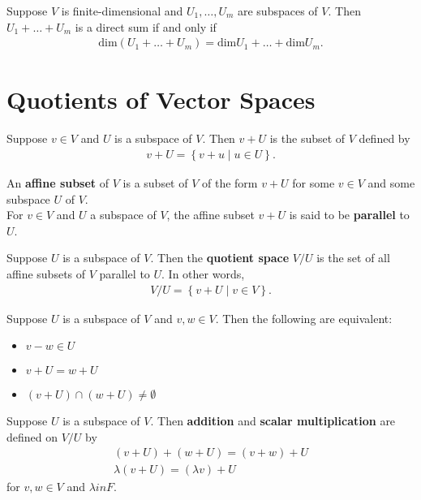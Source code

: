 \documentclass{memoir}
\begin{document}
\begin{lemma}
	Suppose $V$ is finite-dimensional and $U_1,\ldots,U_m$ are subspaces of $V$. Then $U_1+\ldots+U_m$ is a direct sum if and only if
	\begin{align*}
		\textrm{dim}(U_1+\ldots+U_m) = \textrm{dim}U_1 + \ldots + \textrm{dim}U_m.
	\end{align*}
\end{lemma}
\section{Quotients of Vector Spaces}
\label{sec:quotients_of_vector_spaces}
\begin{defn}[v + U]
	Suppose $v \in V$ and $U$ is a subspace of $V$. Then $v+U$ is the subset of $V$ defined by 
	\begin{align*}
		v + U = \left\{v+u \mid u \in U \right\} .
	\end{align*}
\end{defn}
\begin{defn}
	An \textbf{affine subset} of $V$ is a subset of $V$ of the form $v+U$ for some $v \in V$ and some subspace $U$ of $V$.\\

	For $v \in V$ and $U$ a subspace of $V$, the affine subset $v+U$ is said to be \textbf{parallel} to $U$.
\end{defn}
\begin{defn}
	Suppose $U$ is a subspace of $V$. Then the \textbf{quotient space} $V / U$ is the set of all affine subsets of $V$ parallel to $U$. In other words,
	\begin{align*}
		V / U = \left\{v + U \mid v \in V \right\}.
	\end{align*}
\end{defn}
\begin{lemma}
	Suppose $U$ is a subspace of $V$ and $v,w \in V$. Then the following are equivalent:
	\begin{itemize}
		\item $v - w \in U$ 
		\item $v + U = w + U$ 
		\item $(v+U) \cap (w+U) \neq \emptyset$
	\end{itemize}
\end{lemma}
\begin{defn}
	Suppose $U$ is a subspace of $V$. Then \textbf{addition} and \textbf{scalar multiplication} are defined on $V / U$ by 
	\begin{align*}
		(v+U) + (w + U) = (v + w) + U\\
		\lambda(v+U) = (\lambda v) + U
	\end{align*}
	for $v,w \in V$ and $\lambda in F$.
\end{defn}
\end{document}
